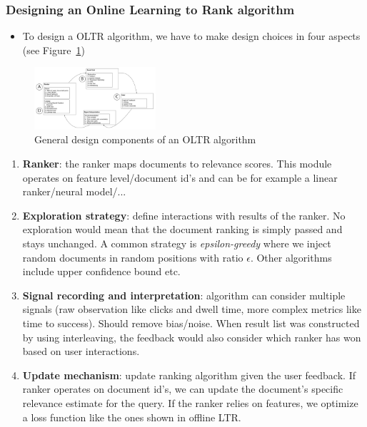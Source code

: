 \subsubsection{Designing an Online Learning to Rank algorithm}
\begin{itemize}
	\item To design a OLTR algorithm, we have to make design choices in four aspects (see Figure~\ref{img:learning_to_rank_online_design})
\end{itemize}
\begin{figure}[ht]
	\centering
	\includegraphics[width=0.4\textwidth]{figures/learning_to_rank_online_design.png}
	\caption{General design components of an OLTR algorithm}
	\label{img:learning_to_rank_online_design}
\end{figure}
\begin{enumerate}[label=(\Alph*)]
	\item \textbf{Ranker}: the ranker maps documents to relevance scores. This module operates on feature level/document id's and can be for example a linear ranker/neural model/...
	\item \textbf{Exploration strategy}: define interactions with results of the ranker. No exploration would mean that the document ranking is simply passed and stays unchanged. A common strategy is \textit{epsilon-greedy} where we inject random documents in random positions with ratio $\epsilon$. Other algorithms include upper confidence bound etc.
	\item \textbf{Signal recording and interpretation}: algorithm can consider multiple signals (raw observation like clicks and dwell time, more complex metrics like time to success). Should remove bias/noise. When result list was constructed by using interleaving, the feedback would also consider which ranker has won based on user interactions.
	\item \textbf{Update mechanism}: update ranking algorithm given the user feedback. If ranker operates on document id's, we can update the document's specific relevance estimate for the query. If the ranker relies on features, we optimize a loss function like the ones shown in offline LTR.
\end{enumerate}
